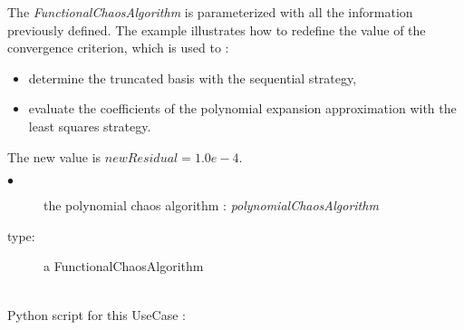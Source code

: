 The \emph{FunctionalChaosAlgorithm} is parameterized with all the information previously defined. The example illustrates how to redefine the value of the convergence criterion, which is used to : 

\begin{itemize}
\item determine the truncated basis with the sequential strategy,
\item evaluate the coefficients of the polynomial expansion approximation with the least squares strategy.
\end{itemize}
The new value is $newResidual = 1.0e-4$.\\


{
  \begin{description}
  \item[$\bullet$] the  polynomial chaos algorithm : {\itshape polynomialChaosAlgorithm}
  \item[type:] a FunctionalChaosAlgorithm
  \end{description}
}

\textspace\\
Python script for this UseCase :

